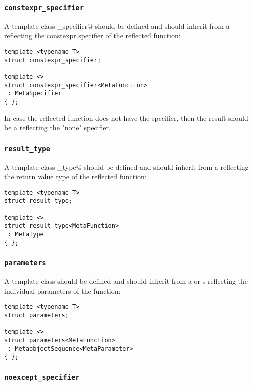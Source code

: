 \subsubsection{\texttt{constexpr\_specifier}}

A template class \verb@constexpr_specifier@ should be defined and should inherit from
a  reflecting the constexpr specifier of the reflected function:

\begin{verbatim}
template <typename T>
struct constexpr_specifier;

template <>
struct constexpr_specifier<MetaFunction>
 : MetaSpecifier
{ };
\end{verbatim}

In case the reflected function does not have the \verb@constexpr@ specifier,
then the result should be a  reflecting the "none" specifier.

\subsubsection{\texttt{result\_type}}

A template class \verb@result_type@ should be defined and should inherit from
a  reflecting the return value type of the reflected function:

\begin{verbatim}
template <typename T>
struct result_type;

template <>
struct result_type<MetaFunction>
 : MetaType
{ };
\end{verbatim}

\subsubsection{\texttt{parameters}}

A template class \verb@parameters@ should be defined and should inherit from
a  or s reflecting the individual parameters
of the function:

\begin{verbatim}
template <typename T>
struct parameters;

template <>
struct parameters<MetaFunction>
 : MetaobjectSequence<MetaParameter>
{ };
\end{verbatim}

\subsubsection{\texttt{noexcept\_specifier}}

